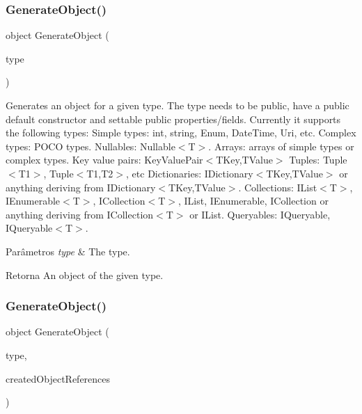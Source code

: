 \subsubsection{\texorpdfstring{Generate\+Object()}{GenerateObject()}\hspace{0.1cm}{\footnotesize\ttfamily [1/2]}}
{\footnotesize\ttfamily object Generate\+Object (\begin{DoxyParamCaption}\item[{Type}]{type }\end{DoxyParamCaption})}



Generates an object for a given type. The type needs to be public, have a public default constructor and settable public properties/fields. Currently it supports the following types\+: Simple types\+: int, string, Enum, Date\+Time, Uri, etc. Complex types\+: P\+O\+CO types. Nullables\+: Nullable$<$\+T$>$. Arrays\+: arrays of simple types or complex types. Key value pairs\+: Key\+Value\+Pair$<$\+T\+Key,\+T\+Value$>$ Tuples\+: Tuple$<$\+T1$>$, Tuple$<$\+T1,\+T2$>$, etc Dictionaries\+: I\+Dictionary$<$\+T\+Key,\+T\+Value$>$ or anything deriving from I\+Dictionary$<$\+T\+Key,\+T\+Value$>$. Collections\+: I\+List$<$\+T$>$, I\+Enumerable$<$\+T$>$, I\+Collection$<$\+T$>$, I\+List, I\+Enumerable, I\+Collection or anything deriving from I\+Collection$<$\+T$>$ or I\+List. Queryables\+: I\+Queryable, I\+Queryable$<$\+T$>$. 


\begin{DoxyParams}{Parâmetros}
{\em type} & The type.\\
\hline
\end{DoxyParams}
\begin{DoxyReturn}{Retorna}
An object of the given type.
\end{DoxyReturn}
\mbox{\label{classApi3Layers_1_1Areas_1_1HelpPage_1_1ObjectGenerator_a8eeb38d007adae0b9b5a217de0da094d}} 
\subsubsection{\texorpdfstring{Generate\+Object()}{GenerateObject()}\hspace{0.1cm}{\footnotesize\ttfamily [2/2]}}
{\footnotesize\ttfamily object Generate\+Object (\begin{DoxyParamCaption}\item[{Type}]{type,  }\item[{Dictionary$<$ Type, object $>$}]{created\+Object\+References }\end{DoxyParamCaption})\hspace{0.3cm}{\ttfamily [private]}}

